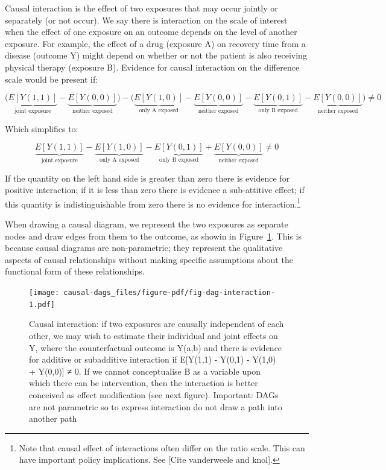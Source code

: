 \documentclass[
  singlecolumn]{report}
\begin{document}
Causal interaction is the effect of two exposures that may occur jointly
or separately (or not occur). We say there is interaction on the scale
of interest when the effect of one exposure on an outcome depends on the
level of another exposure. For example, the effect of a drug (exposure
A) on recovery time from a disease (outcome Y) might depend on whether
or not the patient is also receiving physical therapy (exposure B).
Evidence for causal interaction on the difference scale would be present
if:

\[\bigg(\underbrace{E[Y(1,1)]}_{\text{joint exposure}} - \underbrace{E[Y(0,0)]}_{\text{neither exposed}}\bigg) - \bigg(\underbrace{E[Y(1,0)]}_{\text{only A exposed}} - \underbrace{E[Y(0,0)]}_{\text{neither exposed}}- \underbrace{E[Y(0,1)]}_{\text{only B exposed}} - \underbrace{E[Y(0,0)]}_{\text{neither exposed}} \bigg) \neq 0 \]

Which simplifies to:

\[ \underbrace{E[Y(1,1)]}_{\text{joint exposure}} - \underbrace{E[Y(1,0)]}_{\text{only A exposed}} - \underbrace{E[Y(0,1)]}_{\text{only B exposed}} + \underbrace{E[Y(0,0)]}_{\text{neither exposed}} \neq 0 \]

If the quantity on the left hand side is greater than zero there is
evidence for positive interaction; if it is less than zero there is
evidence a sub-attitive effect; if this quantity is indistinguishable
from zero there is no evidence for interaction.\footnote{Note that
  causal effect of interactions often differ on the ratio scale. This
  can have important policy implications. See {[}Cite vanderweele and
  knol{]}.}

When drawing a causal diagram, we represent the two exposures as
separate nodes and draw edges from them to the outcome, as showin in
Figure~\ref{fig-dag-interaction}. This is because causal diagrams are
non-parametric; they represent the qualitative aspects of causal
relationships without making specific assumptions about the functional
form of these relationships.

\begin{figure}

{\centering \texttt{[image: causal-dags\_files/figure-pdf/fig-dag-interaction-1.pdf]}

}

\caption{\label{fig-dag-interaction}Causal interaction: if two exposures
are causally independent of each other, we may wish to estimate their
individual and joint effects on Y, where the counterfactual outcome is
Y(a,b) and there is evidence for additive or subadditive interaction if
E{[}Y(1,1) - Y(0,1) - Y(1,0) + Y(0,0){]} ≠ 0. If we cannot conceptualise
B as a variable upon which there can be intervention, then the
interaction is better conceived as effect modification (see next
figure). Important: DAGs are not parametric so to express interaction do
not draw a path into another path}

\end{figure}
\end{document}
